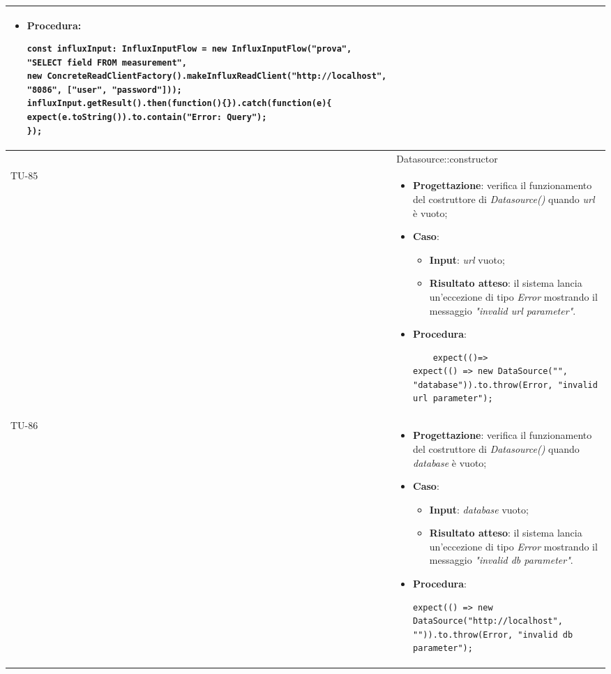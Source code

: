 \begin{longtable}{|C{1.5cm}|C{14.5cm}|}
\begin{itemize}
	\item \textbf{Procedura}:
	\begin{lstlisting}
const influxInput: InfluxInputFlow = new InfluxInputFlow("prova", "SELECT field FROM measurement", 
new ConcreteReadClientFactory().makeInfluxReadClient("http://localhost", "8086", ["user", "password"]));
influxInput.getResult().then(function(){}).catch(function(e){
expect(e.toString()).to.contain("Error: Query");
});
	\end{lstlisting}
\end{itemize}\\
\hline
{} & Datasource::constructor
\\ \hline
{TU-85} &
\begin{itemize}
	\item \textbf{Progettazione}: verifica il funzionamento del costruttore di \emph{Datasource()} quando \emph{url} è vuoto;
	\item \textbf{Caso}: 
	\begin{itemize}
		\item \textbf{Input}: \emph{url} vuoto;
		\item \textbf{Risultato atteso}: il sistema lancia un'eccezione di tipo \emph{Error} mostrando il messaggio \emph{"invalid url parameter"}.
	\end{itemize}
	\item \textbf{Procedura}:
	\begin{lstlisting}
	expect(()=> 
expect(() => new DataSource("", "database")).to.throw(Error, "invalid url parameter");
	\end{lstlisting}
\end{itemize}\\
\hline
{TU-86} &
\begin{itemize}
	\item \textbf{Progettazione}: verifica il funzionamento del costruttore di \emph{Datasource()} quando \emph{database} è vuoto;
	\item \textbf{Caso}: 
	\begin{itemize}
		\item \textbf{Input}: \emph{database} vuoto;
		\item \textbf{Risultato atteso}: il sistema lancia un'eccezione di tipo \emph{Error} mostrando il messaggio \emph{"invalid db parameter"}.
	\end{itemize}
	\item \textbf{Procedura}:
	\begin{lstlisting}
expect(() => new DataSource("http://localhost", "")).to.throw(Error, "invalid db parameter");

\end{lstlisting}
\end{itemize}
\end{longtable}
